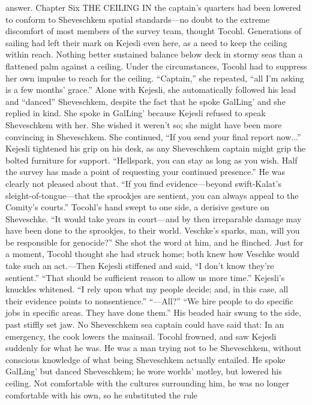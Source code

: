\documentclass[9pt]{article}
\begin{document}
answer.
Chapter Six
THE CEILING IN the captain’s quarters had been lowered to conform to Sheveschkem spatial
standards—no doubt to the extreme discomfort of most members of the survey team, thought Tocohl.
Generations of sailing had left their mark on Kejesli even here, as a need to keep the ceiling within reach.
Nothing better sustained balance below deck in stormy seas than a flattened palm against a ceiling. Under
the circumstances, Tocohl had to suppress her own impulse to reach for the ceiling. “Captain,” she
repeated, “all I’m asking is a few months’ grace.”
Alone with Kejesli, she automatically followed his lead and “danced” Sheveschkem, despite the fact
that he spoke GalLing’ and she replied in kind. She spoke in GalLing’ because Kejesli refused to speak
Sheveschkem with her. She wished it weren’t so; she might have been more convincing in Sheveschkem.
She continued, “If you send your final report now...”
Kejesli tightened his grip on his desk, as any Sheveschkem captain might grip the bolted furniture for
support. “Hellspark, you can stay as long as you wish. Half the survey has made a point of requesting
your continued presence.” He was clearly not pleased about that. “If you find evidence—beyond
swift-Kalat’s sleight-of-tongue—that the sprookjes are sentient, you can always appeal to the Comity’s
courts.”
Tocohl’s hand swept to one side, a derisive gesture on Sheveschke. “It would take years in
court—and by then irreparable damage may have been done to the sprookjes, to their world. Veschke’s
sparks, man, will you be responsible for genocide?” She shot the word at him, and he flinched.
Just for a moment, Tocohl thought she had struck home; both knew how Veschke would take such
an act.—Then Kejesli stiffened and said, “I don’t know they’re sentient.”
“That should be sufficient reason to allow us more time.”
Kejesli’s knuckles whitened. “I rely upon what my people decide; and, in this case, all their evidence
points to nonsentience.”
“—All?”
“We hire people to do specific jobs in specific areas. They have done them.” His beaded hair swung
to the side, past stiffly set jaw.
No Sheveschkem sea captain could have said that: In an emergency, the cook lowers the mainsail.
Tocohl frowned, and saw Kejesli suddenly for what he was. He was a man trying not to be
Sheveschkem, without conscious knowledge of what being Sheveschkem actually entailed. He spoke
GalLing’ but danced Sheveschkem; he wore worlds’ motley, but lowered his ceiling. Not comfortable
with the cultures surrounding him, he was no longer comfortable with his own, so he substituted the rule
\end{document}
